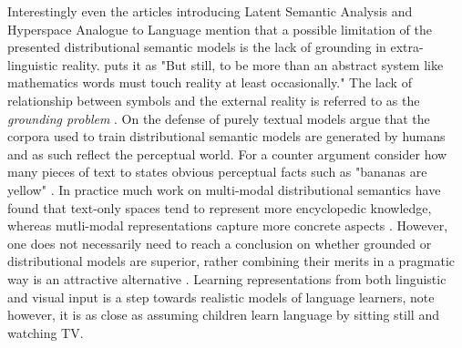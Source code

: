 Interestingly even the articles introducing Latent Semantic Analysis
\cite{landauer1997solution} and Hyperspace Analogue to Language \cite{lund1996producing} mention
that a possible limitation of the presented distributional semantic models is the lack of
grounding in extra-linguistic reality. \cite{landauer1997solution} puts it as "But still, to be more than
an abstract system like mathematics words must touch reality at least occasionally."
The lack of relationship between symbols and the external reality is referred
to as the \emph{grounding problem} \cite{harnad1990symbol,perfetti1998limits}.
On the defense of purely textual models \cite{louwerse2011symbol} argue that the corpora
used to train distributional semantic models are generated by humans and as such reflect the perceptual world.
For a counter argument consider how many pieces of text to states obvious perceptual
facts such as "bananas are yellow" \cite{bruni2014multimodal}.
In practice much work on multi-modal distributional semantics have found that text-only spaces tend to
represent more encyclopedic knowledge, whereas mutli-modal representations capture more concrete aspects
\cite{andrews2009integrating,baroni2008concepts}. However, one does not necessarily need to
reach a conclusion on whether grounded or distributional models are superior, rather combining their merits in a
pragmatic way is an attractive alternative \cite{riordan2011redundancy}. Learning representations
from both linguistic and visual input is a step towards realistic models of language learners, note however,
it is as close as assuming children
learn language by sitting still and watching TV.


